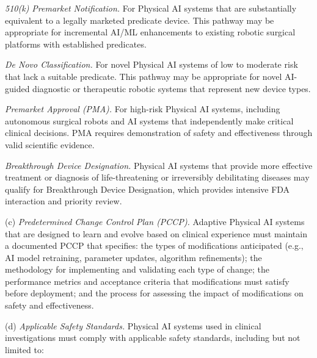 \begin{description}[leftmargin=1.0cm,style=sameline]
\item[(1)] \textit{510(k) Premarket Notification.} For Physical AI systems that are substantially equivalent to a legally marketed predicate device. This pathway may be appropriate for incremental AI/ML enhancements to existing robotic surgical platforms with established predicates.
\item[(2)] \textit{De Novo Classification.} For novel Physical AI systems of low to moderate risk that lack a suitable predicate. This pathway may be appropriate for novel AI-guided diagnostic or therapeutic robotic systems that represent new device types.
\item[(3)] \textit{Premarket Approval (PMA).} For high-risk Physical AI systems, including autonomous surgical robots and AI systems that independently make critical clinical decisions. PMA requires demonstration of safety and effectiveness through valid scientific evidence.
\item[(4)] \textit{Breakthrough Device Designation.} Physical AI systems that provide more effective treatment or diagnosis of life-threatening or irreversibly debilitating diseases may qualify for Breakthrough Device Designation, which provides intensive FDA interaction and priority review.
\end{description}

(c) \textit{Predetermined Change Control Plan (PCCP).} Adaptive Physical AI systems that are designed to learn and evolve based on clinical experience must maintain a documented PCCP that specifies: the types of modifications anticipated (e.g., AI model retraining, parameter updates, algorithm refinements); the methodology for implementing and validating each type of change; the performance metrics and acceptance criteria that modifications must satisfy before deployment; and the process for assessing the impact of modifications on safety and effectiveness.

(d) \textit{Applicable Safety Standards.} Physical AI systems used in clinical investigations must comply with applicable safety standards, including but not limited to:

